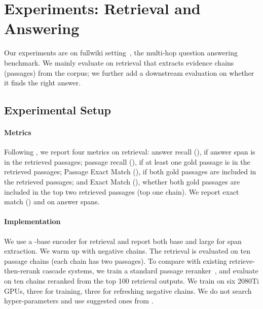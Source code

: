 
\section{Experiments: Retrieval and Answering}
\label{sec:experiment}


Our experiments are on \hotpot{} fullwiki setting~\cite{yang+18b}, the
multi-hop question answering benchmark.  We mainly evaluate on
retrieval that extracts evidence chains (passages) from the corpus; we
further add a downstream evaluation on whether it finds the right
answer.


\subsection{Experimental Setup}




\paragraph{Metrics}
Following \citet{asai2020learning}, we report four metrics
on retrieval:
%
answer recall (), if answer span is in the retrieved
passages;
%
passage recall (), if at least one gold passage is in the
retrieved passages;
%
Passage Exact Match (), if both gold passages are included
in the retrieved passages;
%
and Exact Match (),
whether both gold passages are included in the top two retrieved
passages (top one chain).
%
We report exact match () and \fone{} on
answer spans.


\paragraph{Implementation}

We use a \bert{}-base encoder for retrieval and report both \bert{}
base and large for span extraction.
%
We warm up \name{} with  negative chains.
%
The retrieval is evaluated on ten passage chains (each chain has two
passages).
%
To compare with existing retrieve-then-rerank cascade systems, we
train a standard \bert{} passage reranker~\cite{nogueira2019passage},
and evaluate on ten chains reranked from the top 100 retrieval
outputs.
%
We train \name{} on six 2080Ti GPUs, 
three for training, three for refreshing negative chains. 
We do not search hyper-parameters and use suggested ones 
from \citet{xiong2020approximate}.
%

